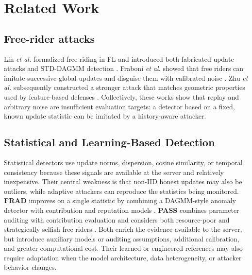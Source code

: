 \documentclass[conference]{IEEEtran}
\begin{document}
\section{Related Work}
\subsection{Free-rider attacks}
Lin \emph{et al.} formalized free riding in FL and introduced both fabricated-update attacks and STD-DAGMM detection \cite{lin2019freeriders}. Fraboni \emph{et al.} showed that free riders can imitate successive global updates and disguise them with calibrated noise \cite{fraboni2021freerider}. Zhu \emph{et al.} subsequently constructed a stronger attack that matches geometric properties used by feature-based defenses \cite{zhu2023advanced}. Collectively, these works show that replay and arbitrary noise are insufficient evaluation targets: a detector based on a fixed, known update statistic can be imitated by a history-aware attacker.

\subsection{Statistical and Learning-Based Detection}
Statistical detectors use update norms, dispersion, cosine similarity, or temporal consistency because these signals are available at the server and relatively inexpensive. Their central weakness is that non-IID honest updates may also be outliers, while adaptive attackers can reproduce the statistics being monitored. \textbf{FRAD} improves on a single statistic by combining a DAGMM-style anomaly detector with contribution and reputation models \cite{wang2024frad}. \textbf{PASS} combines parameter auditing with contribution evaluation and considers both resource-poor and strategically selfish free riders \cite{wang2023pass}. Both enrich the evidence available to the server, but introduce auxiliary models or auditing assumptions, additional calibration, and greater computational cost. Their learned or engineered references may also require adaptation when the model architecture, data heterogeneity, or attacker behavior changes.
\end{document}
